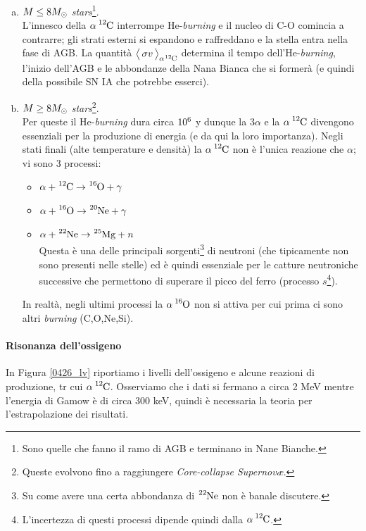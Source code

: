 \begin{enumerate}[a)]
	\item $M\leq 8 M_{\odot}$ \textit{stars}\footnote{Sono quelle che fanno il ramo di AGB e terminano in Nane Bianche.}.\\ 
	L'innesco della $\alpha\,\ce{^{12}C}$ interrompe He-\textit{burning} e il nucleo di C-O comincia a contrarre; gli strati esterni si espandono e raffreddano e la stella entra nella fase di AGB. La quantità $\mean{\sigma v}_{\alpha\ce{^{12}C}}$ determina il tempo dell'He-\textit{burning}, l'inizio dell'AGB e le abbondanze della Nana Bianca che si formerà (e quindi della possibile SN IA che potrebbe esserci).  
	\item $M\geq 8M_{\odot}$ \textit{stars}\footnote{Queste evolvono fino a raggiungere \textit{Core-collapse Supernov\ae}.}.\\ 
	Per queste il He-\textit{burning} dura circa $10^{6}$ y dunque la $3\alpha$ e la $\alpha\,\ce{^{12}C}$ divengono essenziali per la produzione di energia (e da qui la loro importanza). Negli stati finali (alte temperature e densità) la $\alpha\,\ce{^{12}C}$ non è l'unica reazione che  $\alpha$; vi sono 3 processi:
	\begin{itemize}
		\item $\alpha + \ce{^{12}C} \to \ce{^{16}O} + \gamma$ 
		\item $\alpha + \ce{^{16}O} \to \ce{^{20}Ne} + \gamma $
		\item $\alpha + \ce{^{22}Ne} \to \ce{^{25}Mg} + n$\\ 
		Questa è una delle principali sorgenti\footnote{Su come avere una certa abbondanza di $\ce{^{22}Ne}$ non è banale discutere.} di neutroni (che tipicamente non sono presenti nelle stelle) ed è quindi essenziale per le catture neutroniche successive che permettono di superare il picco del ferro (processo $s$\footnote{L'incertezza di questi processi dipende quindi dalla $\alpha \, \ce{^{12}C}$.}).
	\end{itemize} 
	In realtà, negli ultimi processi la $\alpha \, \ce{^{16}O}$ non si attiva per cui prima ci sono altri \textit{burning} (C,O,Ne,Si).
\end{enumerate} 

\paragraph{Risonanza dell'ossigeno} 
In Figura \ref{0426_lv} riportiamo i livelli dell'ossigeno e alcune reazioni di produzione, tr cui $\alpha \, \ce{^{12}C}$. Osserviamo che i dati si fermano a circa 2 MeV mentre l'energia di Gamow è di circa 300 keV, quindi è necessaria la teoria per l'estrapolazione dei risultati.

